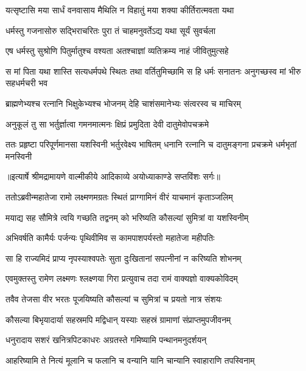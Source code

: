 \twolineshloka
{यत्सृष्टासि मया सार्धं वनवासाय मैथिलि}
{न विहातुं मया शक्या कीर्तिरात्मवता यथा} %

\twolineshloka
{धर्मस्तु गजनासोरु सद्भिराचरितः पुरा}
{तं चाहमनुवर्तेऽद्य यथा सूर्यं सुवर्चला} %

\twolineshloka
{एष धर्मस्तु सुश्रोणि पितुर्मातुश्च वश्यता}
{अतश्चाज्ञां व्यतिक्रम्य नाहं जीवितुमुत्सहे} %

\threelineshloka
{स मां पिता यथा शास्ति सत्यधर्मपथे स्थितः}
{तथा वर्तितुमिच्छामि स हि धर्मः सनातनः}
{अनुगच्छस्व मां भीरु सहधर्मचरी भव} %

\twolineshloka
{ब्राह्मणेभ्यश्च रत्नानि भिक्षुकेभ्यश्च भोजनम्}
{देहि चाशंसमानेभ्यः संत्वरस्व च माचिरम्} %

\twolineshloka
{अनुकूलं तु सा भर्तुर्ज्ञात्वा गमनमात्मनः}
{क्षिप्रं प्रमुदिता देवी दातुमेवोपचक्रमे} %

\fourlineindentedshloka
{ततः प्रहृष्टा परिपूर्णमानसा}
{ यशस्विनी भर्तुरवेक्ष्य भाषितम्}
{धनानि रत्नानि च दातुमङ्गना}
{ प्रचक्रमे धर्मभृतां मनस्विनी} %


{॥इत्यार्षे श्रीमद्रामायणे वाल्मीकीये आदिकाव्ये अयोध्याकाण्डे सप्तविंशः सर्गः॥}


\twolineshloka
{ततोऽब्रवीन्महातेजा रामो लक्ष्मणमग्रतः}
{स्थितं प्राग्गामिनं वीरं याचमानं कृताञ्जलिम्} %

\twolineshloka
{मयाद्य सह सौमित्रे त्वयि गच्छति तद्वनम्}
{को भरिष्यति कौसल्यां सुमित्रां वा यशस्विनीम्} %

\twolineshloka
{अभिवर्षति कामैर्यः पर्जन्यः पृथिवीमिव}
{स कामपाशपर्यस्तो महातेजा महीपतिः} %

\twolineshloka
{सा हि राज्यमिदं प्राप्य नृपस्याश्वपतेः सुता}
{दुःखितानां सपत्नीनां न करिष्यति शोभनम्} %

\twolineshloka
{एवमुक्तस्तु रामेण लक्ष्मणः श्लक्ष्णया गिरा}
{प्रत्युवाच तदा रामं वाक्यज्ञो वाक्यकोविदम्} %

\twolineshloka
{तवैव तेजसा वीर भरतः पूजयिष्यति}
{कौसल्यां च सुमित्रां च प्रयतो नात्र संशयः} %

\twolineshloka
{कौसल्या बिभृयादार्या सहस्रमपि मद्विधान्}
{यस्याः सहस्रं ग्रामाणां संप्राप्तमुपजीवनम्} %

\twolineshloka
{धनुरादाय सशरं खनित्रपिटकाधरः}
{अग्रतस्ते गमिष्यामि पन्थानमनुदर्शयन्} %

\twolineshloka
{आहरिष्यामि ते नित्यं मूलानि च फलानि च}
{वन्यानि यानि चान्यानि स्वाहाराणि तपस्विनाम्} %


